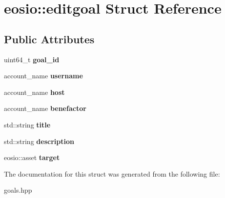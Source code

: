 \hypertarget{structeosio_1_1editgoal}{}\section{eosio\+:\+:editgoal Struct Reference}
\label{structeosio_1_1editgoal}
\subsection*{Public Attributes}
\begin{DoxyCompactItemize}
\item 
\mbox{\label{structeosio_1_1editgoal_a8729a36f0746a37f0e2341328cdf6ed0}} 
uint64\+\_\+t {\bfseries goal\+\_\+id}
\item 
\mbox{\label{structeosio_1_1editgoal_ae0f4cc8c51bcdb60713403e8a24f9b8e}} 
account\+\_\+name {\bfseries username}
\item 
\mbox{\label{structeosio_1_1editgoal_a4861fbc0e358035804eb1c1b0dc49a63}} 
account\+\_\+name {\bfseries host}
\item 
\mbox{\label{structeosio_1_1editgoal_ada22766d8ad26b5ac89a3037e6982d3c}} 
account\+\_\+name {\bfseries benefactor}
\item 
\mbox{\label{structeosio_1_1editgoal_a0164d5a8e0c253493963a8c36c4ff942}} 
std\+::string {\bfseries title}
\item 
\mbox{\label{structeosio_1_1editgoal_a7a3d2bc336dc4283016f7a51d944de75}} 
std\+::string {\bfseries description}
\item 
\mbox{\label{structeosio_1_1editgoal_a1164024440a11e1230458d8aeed63619}} 
eosio\+::asset {\bfseries target}
\end{DoxyCompactItemize}


The documentation for this struct was generated from the following file\+:\begin{DoxyCompactItemize}
\item 
goals.\+hpp\end{DoxyCompactItemize}
